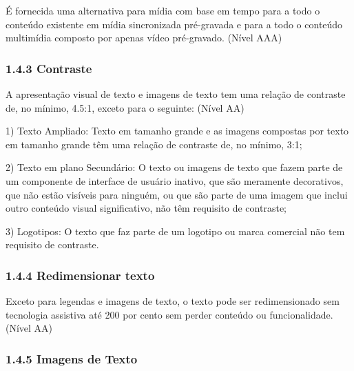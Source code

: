 \documentclass[a4paper]{article}
\begin{document}
\begin{titlepage}
É fornecida uma alternativa para mídia com base em tempo para a todo o conteúdo existente em mídia sincronizada pré-gravada e para a todo o conteúdo multimídia composto por apenas vídeo pré-gravado. (Nível AAA)

\subsubsection{1.4.3 Contraste}

A apresentação visual de texto e imagens de texto tem uma relação de contraste de, no mínimo, 4.5:1, exceto para o seguinte: (Nível AA)\\

\hspace{.1\textwidth} %
\begin{minipage}{.85\textwidth}
	1) Texto Ampliado: Texto em tamanho grande e as imagens compostas por texto em tamanho grande têm uma relação de contraste de, no mínimo, 3:1;\\
\end{minipage}

\hspace{.1\textwidth} %
\begin{minipage}{.85\textwidth}
	2) Texto em plano Secundário: O texto ou imagens de texto que fazem parte de um componente de interface de usuário inativo, que são meramente decorativos, que não estão visíveis para ninguém, ou que são parte de uma imagem que inclui outro conteúdo visual significativo, não têm requisito de contraste;\\
\end{minipage}

\hspace{.1\textwidth} %
\begin{minipage}{.85\textwidth}
	3) Logotipos: O texto que faz parte de um logotipo ou marca comercial não tem requisito de contraste.\\
\end{minipage}

\subsubsection{1.4.4 Redimensionar texto}

Exceto para legendas e imagens de texto, o texto pode ser redimensionado sem tecnologia assistiva até 200 por cento sem perder conteúdo ou funcionalidade. (Nível AA)

\subsubsection{1.4.5 Imagens de Texto}


\end{titlepage}
\end{document}
